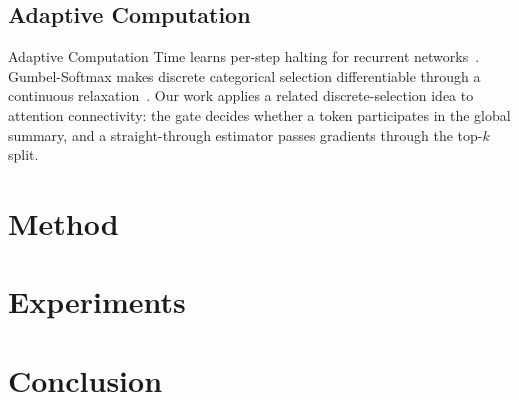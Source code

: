 \documentclass[10pt]{article}
\begin{document}
\subsection{Adaptive Computation}
\label{sec:adaptive}
Adaptive Computation Time learns per-step halting for recurrent networks~\cite{Graves2016Adaptive}. Gumbel-Softmax makes discrete categorical selection differentiable through a continuous relaxation~\cite{Jang2017Categorical}. Our work applies a related discrete-selection idea to attention connectivity: the gate decides whether a token participates in the global summary, and a straight-through estimator passes gradients through the top-$k$ split.


\section{Method}

\section{Experiments}

\section{Conclusion}



\end{document}
